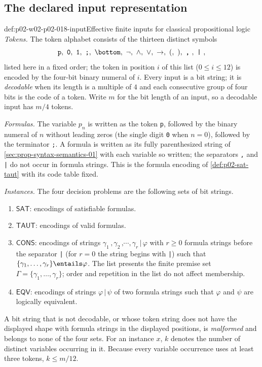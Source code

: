 \subsection{The declared input representation}
\label{sec:p02-w02-p02-018-input}

\begin{hbconvention}{def:p02-w02-p02-018-input}{Effective finite inputs for classical propositional logic}
\emph{Tokens.}  The token alphabet consists of the thirteen distinct symbols
\[
 \texttt{p},\ \texttt{0},\ \texttt{1},\ \texttt{;},\ \bottom,\ \neg,\
 \land,\ \lor,\ \to,\ (,\ ),\ \texttt{,}\ ,\ \texttt{|}\ ,
\]
listed here in a fixed order; the token in position \(i\) of this list
(\(0\leq i\leq 12\)) is encoded by the four-bit binary numeral of \(i\).
Every input is a bit string; it is \emph{decodable} when its length is a
multiple of \(4\) and each consecutive group of four bits is the code of a token.
Write \(m\) for the bit length of an input, so a decodable input has \(m/4\)
tokens.

\emph{Formulas.}  The variable \(p_n\) is written as the token \texttt{p},
followed by the binary numeral of \(n\) without leading zeros (the single
digit \texttt{0} when \(n=0\)), followed by the terminator \texttt{;}.  A
formula is written as its fully parenthesized string of
\cref{sec:prop-syntax-semantics-01} with each variable so written; the
separators \texttt{,} and \texttt{|} do not occur in formula strings.  This
is the formula encoding of \cref{def:p02-sat-taut} with its code table
fixed.

\emph{Instances.}  The four decision problems are the following sets of bit
strings.
\begin{enumerate}
\item \(\mathsf{SAT}\): encodings of satisfiable formulas.
\item \(\mathsf{TAUT}\): encodings of valid formulas.
\item \(\mathsf{CONS}\): encodings of strings
      \(\gamma_1\,\texttt{,}\,\gamma_2\,\texttt{,}\cdots\texttt{,}\,\gamma_r\,
      \texttt{|}\,\varphi\) with \(r\geq0\) formula strings before the
      separator \texttt{|} (for \(r=0\) the string begins with \texttt{|})
      such that \(\{\gamma_1,\ldots,\gamma_r\}\entails\varphi\).  The list
      presents the finite premise set \(\Gamma=\{\gamma_1,\ldots,\gamma_r\}\);
      order and repetition in the list do not affect membership.
\item \(\mathsf{EQV}\): encodings of strings
      \(\varphi\,\texttt{|}\,\psi\) of two formula strings such that
      \(\varphi\) and \(\psi\) are logically equivalent.
\end{enumerate}
A bit string that is not decodable, or whose token string does not have the
displayed shape with formula strings in the displayed positions, is
\emph{malformed} and belongs to none of the four sets.  For an instance
\(x\), \(k\) denotes the number of distinct variables occurring in it.
Because every variable occurrence uses at least three tokens,
\(k\leq m/12\).


\end{hbconvention}
